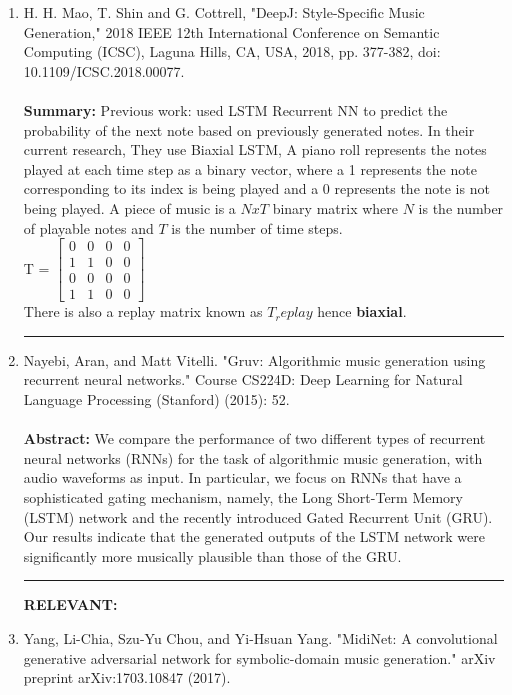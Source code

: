 \documentclass{article}
\begin{document}
\begin{enumerate}
    \item H. H. Mao, T. Shin and G. Cottrell, "DeepJ: Style-Specific Music Generation," 2018 IEEE 12th International Conference on Semantic Computing (ICSC), Laguna Hills, CA, USA, 2018, pp. 377-382, doi: 10.1109/ICSC.2018.00077. \\
    \\
    \textbf{Summary:} Previous work: used LSTM Recurrent NN to predict the probability of the next note based on previously generated notes. In their current
    research, They use Biaxial LSTM, A piano roll represents the notes played at each time step as a binary vector, where a 1 represents the note corresponding to its index is being played and a 0 represents the note is not being played. A piece of music is a $NxT$ binary matrix where $N$ is the number of playable notes and $T$ is the number of time steps.\\
    T = $\begin{bmatrix}
    0 & 0 & 0 & 0\\
    1 & 1 & 0 & 0\\
    0 & 0 & 0 & 0\\
    1 & 1 & 0 & 0
    \end{bmatrix}$\\
    There is also a replay matrix known as $T_replay$ hence \textbf{biaxial}.\\
\noindent\rule{\textwidth}{1pt}
    \item Nayebi, Aran, and Matt Vitelli. "Gruv: Algorithmic music generation using recurrent neural networks." Course CS224D: Deep Learning for Natural Language Processing (Stanford) (2015): 52.\\
    \\
    \textbf{Abstract:} We compare the performance of two different types of recurrent neural networks (RNNs) for the task of algorithmic music generation, with audio waveforms as input. In particular, we focus on RNNs that have a sophisticated gating mechanism, namely, the Long Short-Term Memory (LSTM) network and the recently introduced Gated Recurrent Unit (GRU). Our results indicate that the generated outputs of the LSTM network were significantly more musically plausible than those of the GRU.
\noindent\rule{\textwidth}{1pt}
    \textbf{RELEVANT:}
    \item Yang, Li-Chia, Szu-Yu Chou, and Yi-Hsuan Yang. "MidiNet: A convolutional generative adversarial network for symbolic-domain music generation." arXiv preprint arXiv:1703.10847 (2017).\\

\end{enumerate}
\end{document}
